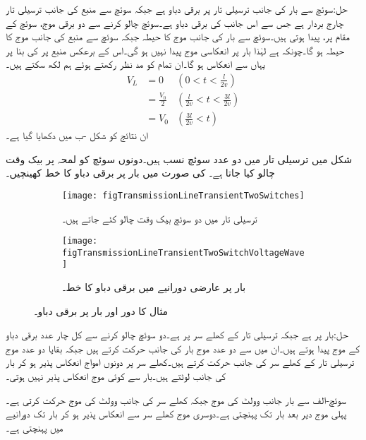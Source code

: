 حل:سوئچ سے بار کی جانب ترسیلی تار پر  برقی دباو ہے جبکہ سوئچ سے منبع کی جانب ترسیلی تار چارج بردار ہے جس سے اس جانب کی برقی دباو  ہے۔سوئچ چالو کرنے سے  دو برقی موج، سوئچ کے مقام پر،  پیدا ہوتی ہیں۔سوئچ سے بار کی جانب موج کا حیطہ  جبکہ سوئچ سے منبع کی جانب موج کا حیطہ  ہو گا۔چونکہ  ہے لہٰذا بار پر انعکاسی موج پیدا نہیں ہو گی۔اس کے برعکس منبع پر  کی بنا پر یہاں سے انعکاس ہو گا۔ان تمام کو مد نظر رکھتے ہوئے ہم لکھ سکتے ہیں۔
\begin{align*}
V_L&=0  &(0<t<\tfrac{l}{2v})\\
&=\frac{V_0}{2} & (\tfrac{l}{2v} < t < \tfrac{3l}{2v})\\
&=V_0 & (\tfrac{3l}{2v} < t  )
\end{align*}
ان نتائج کو شکل -ب میں دکھایا گیا ہے۔

شکل  میں ترسیلی تار میں دو عدد سوئچ نسب ہیں۔دونوں سوئچ کو لمحہ  پر بیک وقت چالو کیا جاتا ہے۔ کی صورت میں بار پر برقی دباو کا خط کھینچیں۔
\begin{figure}
\centering
\begin{subfigure}{0.8\textwidth}
\centering
\texttt{[image: figTransmissionLineTransientTwoSwitches]}
\caption{ترسیلی تار میں دو سوئچ بیک وقت چالو کئے جاتے ہیں۔}
\end{subfigure}

\begin{subfigure}{0.8\textwidth}
\centering
\texttt{[image: figTransmissionLineTransientTwoSwitchVoltageWave]}
\caption{بار پر عارضی دورانیے  میں برقی دباو کا خط۔}
\end{subfigure}
\caption{مثال  کا دور اور بار پر برقی دباو۔}
\label{شکل_ترسیلی_مثال_دو_سوئچ}
\end{figure}

حل:بار پر  ہے جبکہ ترسیلی تار کے کھلے سر پر  ہے۔دو سوئچ چالو کرنے سے کل چار عدد برقی دباو کے موج پیدا ہوتے ہیں۔ان میں سے دو عدد موج بار کی جانب حرکت کرتے ہیں جبکہ بقایا دو عدد موج ترسیلی تار کے کھلے سر کی جانب حرکت کرتے ہیں۔کھلے سر پر دونوں امواج انعکاس پذیر ہو کر بار کی جانب لوٹتے ہیں۔بار سے کوئی موج انعکاس پذیر نہیں ہوتی۔

سوئچ-الف سے  بار جانب  وولٹ کی موج جبکہ کھلے سر کی جانب  وولٹ کی موج حرکت کرتی ہے۔پہلی موج  دیر بعد بار تک پہنچتی ہے۔دوسری موج کھلے سر سے انعکاس پذیر ہو کر بار تک  دورانیے میں پہنچتی ہے۔

